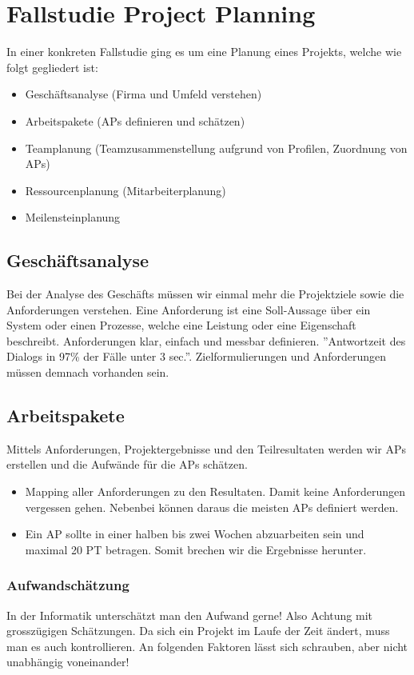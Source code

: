 \chapter{Fallstudie Project Planning}

In einer konkreten Fallstudie ging es um eine Planung eines Projekts, welche wie folgt gegliedert ist:
\begin{itemize}
	\item Geschäftsanalyse (Firma und Umfeld verstehen)
	\item Arbeitspakete (APs definieren und schätzen)
	\item Teamplanung (Teamzusammenstellung aufgrund von Profilen, Zuordnung von APs)
	\item Ressourcenplanung (Mitarbeiterplanung)
	\item Meilensteinplanung
\end{itemize}

\section{Geschäftsanalyse}
Bei der Analyse des Geschäfts müssen wir einmal mehr die Projektziele sowie die Anforderungen verstehen. Eine Anforderung ist eine Soll-Aussage über ein System oder einen Prozesse, welche eine Leistung oder eine Eigenschaft beschreibt. Anforderungen klar, einfach und messbar definieren. ''Antwortzeit des Dialogs in 97\% der Fälle unter 3 sec.''. Zielformulierungen und Anforderungen müssen demnach vorhanden sein.

\section{Arbeitspakete}
Mittels Anforderungen, Projektergebnisse und den Teilresultaten werden wir APs erstellen und die Aufwände für die APs schätzen.

\begin{itemize}
	\item Mapping aller Anforderungen zu den Resultaten. Damit keine Anforderungen vergessen gehen. Nebenbei können daraus die meisten APs definiert werden.
	\item Ein AP sollte in einer halben bis zwei Wochen abzuarbeiten sein und maximal 20 PT betragen. Somit brechen wir die Ergebnisse herunter. 
\end{itemize}

\subsection{Aufwandschätzung}
\label{sec:aufwandschaetzung}
In der Informatik unterschätzt man den Aufwand gerne! Also Achtung mit grosszügigen Schätzungen. Da sich ein Projekt im Laufe der Zeit ändert, muss man es auch kontrollieren. An folgenden Faktoren lässt sich schrauben, aber nicht unabhängig voneinander!

